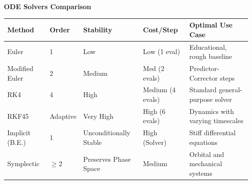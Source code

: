 \documentclass[10pt, landscape, twocolumn]{article}
\begin{document}
{\vspace{1em}
\textbf{\Large ODE Solvers Comparison}
\vspace{0.3em}

\noindent
\begin{tabularx}{0.95\linewidth}{l l X X X}
\toprule
\textbf{Method} & \textbf{Order} & \textbf{Stability} & \textbf{Cost/Step} & \textbf{Optimal Use Case} \\
\midrule
Euler & 1 & Low & Low (1 eval) & Educational, rough baseline \\
Modified Euler & 2 & Medium & Med (2 evals) & Predictor-Corrector steps \\
RK4 & 4 & High & Medium (4 evals) & Standard general-purpose solver \\
RKF45 & Adaptive & Very High & High (6 evals) & Dynamics with varying timescales \\
Implicit (B.E.) & 1 & Unconditionally Stable & High (Solver) & Stiff differential equations \\
Symplectic & $\ge 2$ & Preserves Phase Space & Medium & Orbital and mechanical systems \\
\bottomrule
\end{tabularx}

\par
}

\vspace*{\fill}
\twocolumn
\flushbottom
\end{document}
